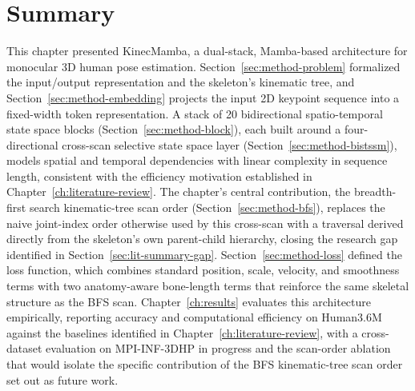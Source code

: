 \section{Summary}
\label{sec:method-summary}

This chapter presented KinecMamba, a dual-stack, Mamba-based architecture for
monocular 3D human pose estimation. Section~\ref{sec:method-problem}
formalized the input/output representation and the skeleton's kinematic
tree, and Section~\ref{sec:method-embedding} projects the input 2D
keypoint sequence into a fixed-width token representation. A stack of 20
bidirectional spatio-temporal state space
blocks (Section~\ref{sec:method-block}), each built around a
four-directional cross-scan selective state space layer
(Section~\ref{sec:method-bistssm}), models spatial and temporal
dependencies with linear complexity in sequence length, consistent with
the efficiency motivation established in Chapter~\ref{ch:literature-review}.
The chapter's central contribution, the breadth-first search kinematic-tree
scan order (Section~\ref{sec:method-bfs}), replaces the naive joint-index
order otherwise used by this cross-scan with a traversal
derived directly from the skeleton's own parent-child hierarchy, closing
the research gap identified in Section~\ref{sec:lit-summary-gap}.
Section~\ref{sec:method-loss}
defined the loss function, which combines standard position, scale,
velocity, and smoothness terms with two anatomy-aware bone-length terms that
reinforce the same skeletal structure as the BFS scan.
Chapter~\ref{ch:results} evaluates this architecture empirically, reporting
accuracy and computational efficiency on Human3.6M against the baselines
identified in Chapter~\ref{ch:literature-review}, with a cross-dataset
evaluation on MPI-INF-3DHP in progress and the scan-order ablation that would
isolate the specific contribution of the BFS kinematic-tree scan order set out
as future work.

\FloatBarrier

